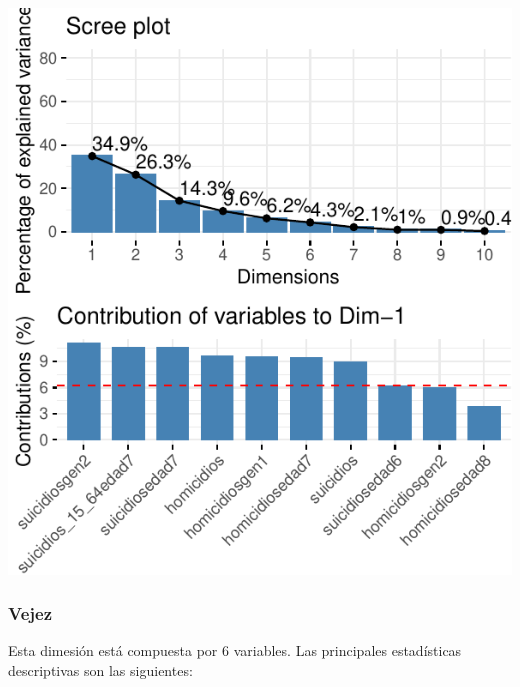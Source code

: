 \includegraphics{Anexo_PCA_files/figure-latex/unnamed-chunk-1-10.pdf}

\hypertarget{vejez}{%
\subsubsection{Vejez}\label{vejez}}

Esta dimesión está compuesta por 6 variables. Las principales
estadísticas descriptivas son las siguientes:

